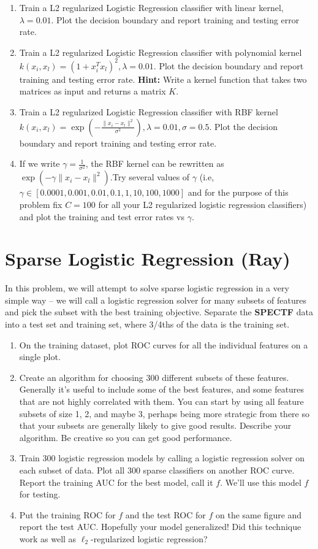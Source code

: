 \documentclass{exam}
\begin{document}
\begin{enumerate}[resume]
    \item Train a L2 regularized Logistic Regression classifier with linear kernel, $\lambda = 0.01$. Plot the decision boundary and report training and testing error rate. 
    \item Train a L2 regularized Logistic Regression classifier with polynomial kernel $k(x_{i},x_{l}) = (1 + x_{i}^Tx_{l})^2, \lambda = 0.01$. Plot the decision boundary and report training and testing error rate. \textbf{Hint: }Write a kernel function that takes two matrices as input and returns a matrix $K$.
    \item Train a L2 regularized Logistic Regression classifier with RBF kernel $k(x_{i},x_{l}) = \exp(-\frac{\|x_i - x_l\|^2}{\sigma^2}), \lambda = 0.01, \sigma = 0.5$. Plot the decision boundary and report training and testing error rate.
    \item If we write $\gamma  = \frac{1}{\sigma^2}$, the RBF kernel can be rewritten as $\exp(-\gamma \|x_i - x_l\|^2)$.Try several values of $\gamma$ (i.e, $\gamma \in [0.0001,0.001,0.01,0.1,1,10,100,1000]$ and for the purpose of this problem fix $C=100$ for all your L2 regularized logistic regression classifiers) and plot the training and test error rates vs $\gamma$. 
\end{enumerate}



\section{Sparse Logistic Regression (Ray)}
In this problem, we will attempt to solve sparse logistic regression in a very simple way -- we will call a logistic regression solver for many subsets of features and pick the subset with the best training objective. Separate the \textbf{SPECTF} data into a test set and training set, where 3/4ths of the data is the training set.

\begin{enumerate}
\item On the training dataset, plot ROC curves for all the individual features on a single plot.  
\item Create an algorithm for choosing 300 different subsets of these features. Generally it's useful to include some of the best features, and some features that are not highly correlated with them. You can start by using all feature subsets of size 1, 2, and maybe 3, perhaps being more strategic from there so that your subsets are generally likely to give good results. Describe your algorithm. Be creative so you can get good performance.
\item Train 300 logistic regression models by calling a logistic regression solver on each subset of data. Plot all 300 sparse classifiers on another ROC curve. Report the training AUC for the best model, call it $f$. We'll use this model $f$ for testing.
\item Put the training ROC for $f$ and the test ROC for $f$ on the same figure and report the test AUC. Hopefully your model generalized! Did this technique work as well as $\ell_2$-regularized logistic regression?
\end{enumerate}
\end{document}
